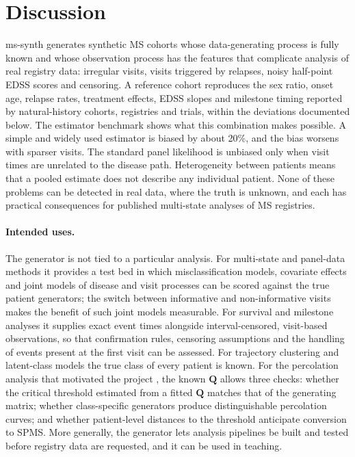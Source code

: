 \documentclass[11pt,a4paper]{article}
\newcommand{\Q}{\mathbf{Q}}
\begin{document}
\section*{Discussion}

ms-synth generates synthetic MS cohorts whose data-generating process is fully known and whose observation process has the features that complicate analysis of real registry data: irregular visits, visits triggered by relapses, noisy half-point EDSS scores and censoring. A reference cohort reproduces the sex ratio, onset age, relapse rates, treatment effects, EDSS slopes and milestone timing reported by natural-history cohorts, registries and trials, within the deviations documented below. The estimator benchmark shows what this combination makes possible. A simple and widely used estimator is biased by about 20\%, and the bias worsens with sparser visits. The standard panel likelihood is unbiased only when visit times are unrelated to the disease path. Heterogeneity between patients means that a pooled estimate does not describe any individual patient. None of these problems can be detected in real data, where the truth is unknown, and each has practical consequences for published multi-state analyses of MS registries.

\paragraph{Intended uses.}
The generator is not tied to a particular analysis. For multi-state and panel-data methods it provides a test bed in which misclassification models, covariate effects and joint models of disease and visit processes \cite{lange2015} can be scored against the true patient generators; the switch between informative and non-informative visits makes the benefit of such joint models measurable. For survival and milestone analyses it supplies exact event times alongside interval-censored, visit-based observations, so that confirmation rules, censoring assumptions and the handling of events present at the first visit can be assessed. For trajectory clustering and latent-class models \cite{signori2023,guo2026} the true class of every patient is known. For the percolation analysis that motivated the project \cite{mirkov2026}, the known $\Q$ allows three checks: whether the critical threshold estimated from a fitted $\Q$ matches that of the generating matrix; whether class-specific generators produce distinguishable percolation curves; and whether patient-level distances to the threshold anticipate conversion to SPMS. More generally, the generator lets analysis pipelines be built and tested before registry data are requested, and it can be used in teaching.
\end{document}
